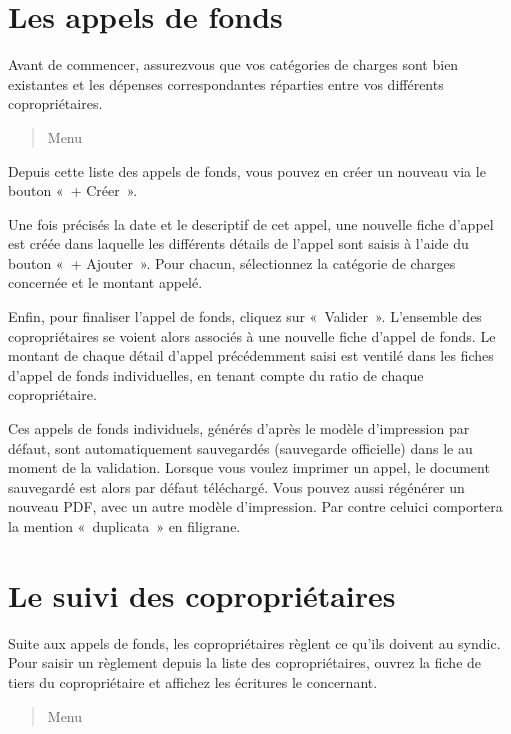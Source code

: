\documentclass[a4paper,10pt,oneside,french]{sphinxmanual}
\begin{document}
\section{Les appels de fonds}
\label{\detokenize{condominium/call_of_funds:les-appels-de-fonds}}\label{\detokenize{condominium/call_of_funds::doc}}
Avant de commencer, assurez\sphinxhyphen{}vous que vos catégories de charges sont bien existantes et les dépenses correspondantes réparties entre vos différents copropriétaires.
\begin{quote}

Menu 
\end{quote}

Depuis cette liste des appels de fonds, vous pouvez en créer un nouveau via le bouton « + Créer ».

Une fois précisés la date et le descriptif de cet appel, une nouvelle fiche d’appel est créée dans laquelle les différents détails de l’appel sont saisis à l’aide du bouton « + Ajouter ». Pour chacun, sélectionnez la catégorie de charges concernée et le montant appelé.
\begin{quote}

\noindent{}
\end{quote}

Enfin, pour finaliser l’appel de fonds, cliquez sur « Valider ».
L’ensemble des copropriétaires se voient alors associés à une nouvelle fiche d’appel de fonds.
Le montant de chaque détail d’appel précédemment saisi est ventilé dans les fiches d’appel de fonds individuelles, en tenant compte du ratio de chaque copropriétaire.

Ces appels de fonds individuels, générés d’après le modèle d’impression par défaut, sont automatiquement sauvegardés (sauvegarde officielle) dans le  au moment de la validation.
Lorsque vous voulez imprimer un appel, le document sauvegardé est alors par défaut téléchargé.
Vous pouvez aussi régénérer un nouveau PDF, avec un autre modèle d’impression. Par contre celui\sphinxhyphen{}ci comportera la mention « duplicata » en filigrane.


\section{Le suivi des copropriétaires}
\label{\detokenize{condominium/payoff:le-suivi-des-coproprietaires}}\label{\detokenize{condominium/payoff::doc}}
Suite aux appels de fonds, les copropriétaires règlent ce qu’ils doivent au syndic.
Pour saisir un règlement depuis la liste des copropriétaires, ouvrez la fiche de tiers du copropriétaire et affichez les écritures le concernant.
\begin{quote}

Menu 
\end{quote}
\end{document}
